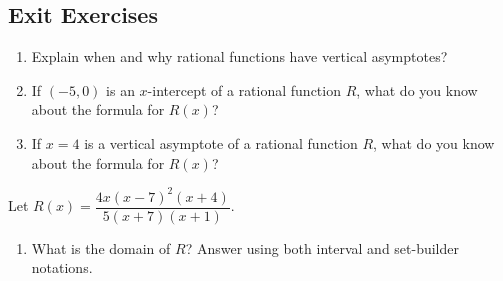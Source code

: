  \newpage

\subsection*{Exit Exercises} \label{exit-functions-rational-short-term}


\begin{myExit}
	\begin{enumerate}
		\item Explain when and why rational functions have vertical asymptotes?
		\vfill
		\item If $(-5,0)$ is an $x$-intercept of a rational function $R$, what do you know about the formula for $R(x)$?
		\vfill
		\item If $x=4$ is a vertical asymptote of a rational function $R$, what do you know about the formula for $R(x)$?
		\vfill
	\end{enumerate}
\end{myExit}

\begin{myExit}
Let $R(x)=\dfrac{4x(x-7)^2(x+4)}{5(x+7)(x+1)}$.
\begin{enumerate}
	\item What is the domain of $R$?  Answer using both interval and set-builder notations.
\vfill
{}
\vfill
	\end{enumerate}
\end{myExit}


































